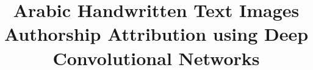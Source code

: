 \documentclass[conference,a4paper,twocolumn]{IEEEtran}
\begin{document}


\title{Arabic Handwritten Text Images Authorship Attribution using Deep Convolutional Networks}



\end{document}
